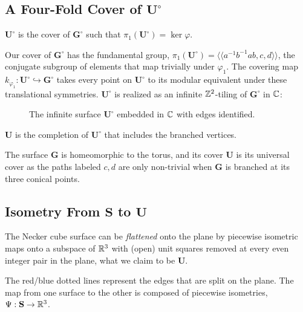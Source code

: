 \documentclass[]{article}
\def\bU{\mathbf{U}} \def\btU{\tilde{\bU}} \def\bUs{\bU^\circ}
\def\bG{\mathbf{G}} \def\bGs{\mathbf{G}^\circ}
\def\<{\langle} \def\>{\rangle}
\begin{document}
\subsection{A Four-Fold Cover of $\bUs$}





\newpage
\begin{Def}
$\bUs$ is the cover of $\bGs$ such that $\pi_1(\bUs)=\ker\varphi$.
\end{Def}

Our cover of $\bGs$ has the fundamental group, $\pi_1(\bUs)=\<\<a^{-1}b^{-1}ab, c, d\>\>$, the conjugate subgroup of elements that map trivially under $\varphi_1$. The covering map $k_{\varphi_1}:\bUs\hookrightarrow\bGs$ takes every point on $\bUs$ to its modular equivalent under these translational symmetries. $\bUs$ is realized as an infinite $\mathbb{Z}^2$-tiling of $\bGs$ in $\mathbb{C}$:
\begin{figure}[H]
\centering

\caption{The infinite surface $\bUs$ embedded in $\mathbb{C}$ with edges identified.}
\end{figure}

\begin{Def}
$\bU$ is the completion of $\bUs$ that includes the branched vertices. 
\end{Def}

\begin{rem}
The surface $\bG$ is homeomorphic to the torus, and its cover $\bU$ is its universal cover as the paths labeled $c,d$ are only non-trivial when $\bG$ is branched at its three conical points.
\end{rem}

\subsection{}

\subsection{Isometry From $\mathbf{S}$ to $\bU$}
The Necker cube surface can be \emph{flattened} onto the plane by piecewise isometric maps onto a subspace of $\mathbb{R}^3$ with (open) unit squares removed at every even integer pair in the plane, what we claim to be $\bU$.

\noindent The red/blue dotted lines represent the edges that are split on the plane. The map from one surface to the other is composed of piecewise isometries, $\Psi:\mathbf{S}\rightarrow\mathbb{R}^3$.
\end{document}
